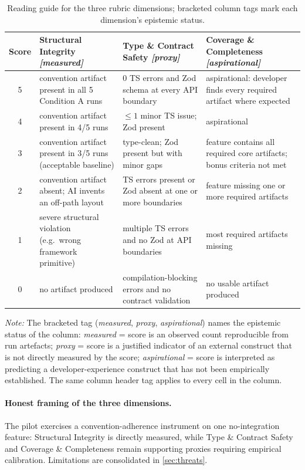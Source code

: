 \documentclass[12pt,a4paper]{report}
\begin{document}
\begin{table}[ht]
\centering
\footnotesize
\renewcommand{\arraystretch}{1.25}
\caption{Reading guide for the three rubric dimensions; bracketed column tags mark each dimension's epistemic status.}
\label{tab:rubric-interpretation}
\begin{tabular}{@{}c p{4.0cm} p{4.0cm} p{4.0cm}@{}}
\toprule
Score & Structural Integrity \emph{[measured]} & Type \& Contract Safety \emph{[proxy]} & Coverage \& Completeness \emph{[aspirational]} \\
\midrule
5 & convention artifact present in all 5 Condition A runs & 0 TS errors and Zod schema at every API boundary & aspirational: developer finds every required artifact where expected \\
4 & convention artifact present in 4/5 runs & $\leq 1$ minor TS issue; Zod present & aspirational \\
3 & convention artifact present in 3/5 runs (acceptable baseline) & type-clean; Zod present but with minor gaps & feature contains all required core artifacts; bonus criteria not met \\
2 & convention artifact absent; AI invents an off-path layout & TS errors present or Zod absent at one or more boundaries & feature missing one or more required artifacts \\
1 & severe structural violation (e.g.\ wrong framework primitive) & multiple TS errors and no Zod at API boundaries & most required artifacts missing \\
0 & no artifact produced & compilation-blocking errors and no contract validation & no usable artifact produced \\
\bottomrule
\end{tabular}
\vspace{2pt}
\footnotesize\textit{Note:} The bracketed tag (\emph{measured}, \emph{proxy}, \emph{aspirational}) names the epistemic status of the column: \emph{measured} = score is an observed count reproducible from run artefacts; \emph{proxy} = score is a justified indicator of an external construct that is not directly measured by the score; \emph{aspirational} = score is interpreted as predicting a developer-experience construct that has not been empirically established. The same column header tag applies to every cell in the column.
\renewcommand{\arraystretch}{1}
\end{table}

\paragraph{Honest framing of the three dimensions.} The pilot exercises a convention-adherence instrument on one no-integration feature: Structural Integrity is directly measured, while Type \& Contract Safety and Coverage \& Completeness remain supporting proxies requiring empirical calibration. Limitations are consolidated in \autoref{sec:threats}.
\end{document}
